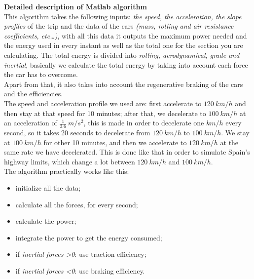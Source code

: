 \documentclass{article}
\begin{document}
\textbf{Detailed description of Matlab algorithm}\\

This algorithm takes the following inputs: \textit{the speed, the acceleration, the slope profiles} of the trip and the data of the cars \textit{(mass, rolling and air resistance coefficients, etc…)}, with all this data it outputs the maximum power needed and the energy used in every instant as well as the total one for the section you are calculating. The total energy is divided into \textit{rolling, aerodynamical, grade and inertial}, basically we calculate the total energy by taking into account each force the car has to overcome.\\
Apart from that, it also takes into account the regenerative braking of the cars and the efficiencies.\\
The speed and acceleration profile we used are: first  accelerate to $120\:km/h$ and then stay at that speed for 10 minutes;  after that, we decelerate to $100\:km/h$ at an acceleration of $\frac{1}{3.6}\:m/s^2$, this is made in order to decelerate one $km/h$ every second, so it takes 20 seconds to decelerate from $120\:km/h$ to $100\:km/h$. We stay at $100\:km/h$ for other 10 minutes, and then we accelerate to $120\:km/h$ at the same rate we have decelerated. This is done like that in order to simulate Spain’s highway limits, which change a lot between $120\:km/h$ and $100\:km/h$.\\

The algorithm practically works like this:\\
\begin{itemize}
\item initialize all the data;\\
\item calculate all the forces, for every second;\\
\item calculate the power;\\
\item integrate the power to get the energy consumed;\\
\item if \textit{inertial forces \textgreater 0}: use traction efficiency;\\
\item if \textit{inertial forces \textless 0}: use braking efficiency.\\
\end{itemize}
\newpage
\end{document}
